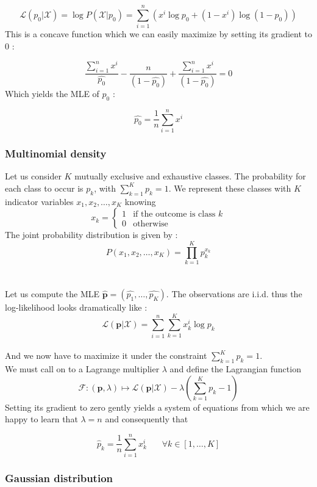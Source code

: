 \documentclass[a4paper,12pt]{article}
\begin{document}
\[\mathcal{L}(p_0|\mathcal{X})=\log{P(\mathcal{X}|p_0)}=\sum_{i=1}^n\left(x^i\log p_0 + (1-x^i)\log{(1-p_0)}\right)\]
This is a concave function which we can easily maximize by setting its gradient to 0 :

\[\frac{\sum_{i=1}^nx^i}{\hat{p_0}}-\frac{n}{(1-\hat{p_0})}+\frac{\sum_{i=1}^nx^i}{(1-\hat{p_0})}= 0
\]
Which yields the MLE of $p_0$ :

\[\hat{p_0}=\frac{1}{n}\sum_{i=1}^nx^i\]


\subsubsection{Multinomial density}

Let us consider $K$ mutually exclusive and exhaustive classes. The probability for each class to occur is $p_k$, with $\sum_{k=1}^Kp_k=1$. We represent these classes with $K$ indicator variables $x_1, x_2, \dots, x_K$ knowing 
\[
    x_k= 
\begin{cases}
    1& \text{if the outcome is class } k\\
    0              & \text{otherwise}
\end{cases}
\]
The joint probability distribution is given by :
\[P(x_1,x_2,\dots,x_K)=\displaystyle\prod_{k=1}^{K}p_k^{x_k}\]\\
\\
Let us compute the MLE $\bm{\hat{p}}=(\hat{p_1},\dots,\hat{p_K})$. The observations are i.i.d. thus the log-likelihood looks dramatically like :
\\
\[\mathcal{L}(\bm p|\mathcal{X})=\sum_{i=1}^n\sum_{k=1}^K x_k^i\log p_k
\]\\
And we now have to maximize it under the constraint $\displaystyle\sum_{k=1}^Kp_k=1$.\\
We must call on to a Lagrange multiplier $\lambda$ and define the Lagrangian function 
\[\mathcal{F} : (\bm p, \lambda) \mapsto \mathcal{L}(\bm p|\mathcal{X})-\lambda \left(\sum_{k=1}^Kp_k - 1\right)\]
Setting its gradient to zero gently yields a system of equations from which we are happy to learn that $\lambda=n$ and consequently that

\[\hat{p}_k=\dfrac{1}{n}\displaystyle\sum_{i=1}^nx_k^i\ \ \ \ \ \ \ \ \forall k \in [1,\dots,K]\]


\subsubsection{Gaussian distribution}
\end{document}
